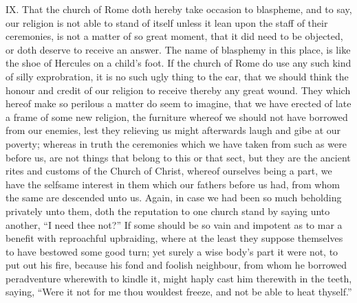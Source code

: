 IX. That the church of Rome doth hereby take occasion to blaspheme, and to say, our religion is not able to stand of itself unless it lean upon the staff of their ceremonies, is not a matter of so great moment, that it did need to be objected, or doth deserve to receive an answer. The name of blasphemy in this place, is like the shoe of Hercules on a child’s foot. If the church of Rome do use any such kind of silly exprobration, it is no such ugly thing to the ear, that we should think the honour and credit of our religion to receive thereby any great wound. They which hereof make so perilous a matter do seem to imagine, that we have erected of late a frame of some new religion, the furniture whereof we should not have borrowed from our enemies, lest they relieving us might afterwards laugh and gibe at our poverty; whereas in truth the ceremonies which we have taken from such as were before us, are not things that belong to this or that sect, but they are the ancient rites and customs of the Church of Christ, whereof ourselves being a part, we have the selfsame interest in them which our fathers before us had, from whom the same are descended unto us. Again, in case we had been so much beholding privately unto them, doth the reputation to one church stand by saying unto another,  “I need thee not?” If some should be so vain and impotent as to mar a benefit with reproachful upbraiding, where at the least they suppose themselves to have bestowed some good turn; yet surely a wise body’s part it were not, to put out his fire, because his fond and foolish neighbour, from whom he borrowed peradventure wherewith to kindle it, might haply cast him therewith in the teeth, saying, “Were it not for me thou wouldest freeze, and not be able to heat thyself.”

